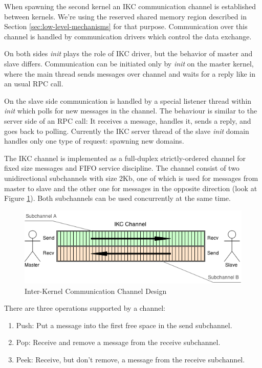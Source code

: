\documentclass[a4paper,10pt]{article}
\begin{document}
	When spawning the second kernel an IKC communication channel is established between kernels.
	We're using the reserved shared memory region described in Section \ref{sec:low-level-mechanisms} for that purpose.
	Communication over this channel is handled by communication drivers which control the data exchange.
	
	On both sides \emph{init} plays the role of IKC driver, but the behavior of master and slave differs.
	Communication can be initiated only by \emph{init} on the master kernel, where the main thread sends messages over channel and waits for a reply like in an usual RPC call.
	
	On the slave side communication is handled by a special listener thread within \emph{init} which polls for new messages in the channel.
	The behaviour is similar to the server side of an RPC call: 
	It receives a message, handles it, sends a reply, and goes back to polling. 
	Currently the IKC server thread of the slave \emph{init} domain handles only one type of request: spawning new domains.
	
	The IKC channel is implemented as a full-duplex strictly-ordered channel for fixed size messages and FIFO service discipline. 
	The channel consist of two unidirectional subchannels with size 2Kb, one of which is used for messages from master to slave and the other one for messages in the opposite direction (look at Figure \ref{fig:ikc}).
	Both subchannels can be used concurrently at the same time.
	
	\begin{figure}[ht]
		\centering
   		\includegraphics[width=\textwidth]{IKC_Structure.png}
		\caption{Inter-Kernel Communication Channel Design}
    		\label{fig:ikc}
	\end{figure} 
		
	There are three operations supported by a channel:
	\begin{enumerate}
		\item Push: Put a message into the first free space in the send subchannel. 
		\item Pop: Receive and remove a message from the receive subchannel.
		\item Peek: Receive, but don't remove, a message from the receive subchannel.
	\end{enumerate}
	
\end{document}
